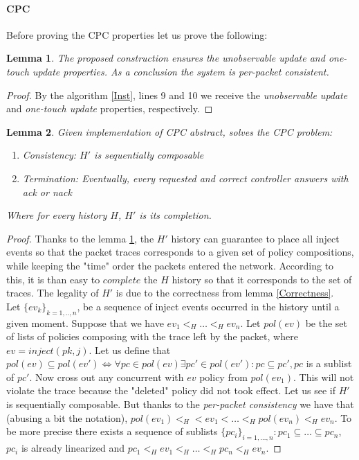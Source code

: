 \documentclass{article}
\newtheorem{lemma}{Lemma}
\theoremstyle{remark}
\begin{document}
\paragraph{CPC} \label{consistencyPC}
Before proving the CPC properties let us prove the following:
\begin{lemma}\label{per-packet consistency} The proposed construction ensures the \emph{unobservable update} and \emph{one-touch update} properties. As a conclusion the system is \emph{per-packet consistent}.
\end{lemma}
\begin{proof}
By the algorithm \ref{Inst}, lines 9 and 10 we receive the \emph{unobservable update} and \emph{one-touch update} properties, respectively.
\end{proof}
\begin{lemma}
Given implementation of CPC abstract, solves the CPC problem:
\begin{enumerate}
\item Consistency: \emph{$H'$ is sequentially composable}
\item Termination: \emph{Eventually, every requested and correct controller answers with} ack or nack
\end{enumerate}
Where for every history $H$, $H'$ is its completion.
\end{lemma}
\begin{proof}
Thanks to the lemma \ref{per-packet consistency}, the $H'$ history can guarantee to place all inject events so that the packet traces corresponds to a given set of policy compositions, while keeping the "time" order the packets entered the network. According to this, it is than easy to $complete$ the $H$ history so that it corresponds to the set of traces.
The legality of $H'$ is due to the correctness from lemma \ref{Correctness}. \\
Let $\lbrace ev_k\rbrace_{k=1,..,n}$, be a sequence of 
inject events occurred in the history until a given moment. Suppose 
that we have $ev_1<_H\ldots <_Hev_n$.
Let $pol(ev)$ be the set of lists of policies composing with the trace left by the packet, where $ev=inject(pk,j)$. Let us define that $pol(ev)\subseteq pol(ev')\Leftrightarrow \forall pc\in pol(ev) \exists pc'\in pol(ev'): pc\subseteq pc',pc$ is a sublist of $pc'$. Now cross out any concurrent with $ev$ policy from $pol(ev_1)$. This will not violate the trace because the "deleted" policy did not took effect. 
Let us see if $H'$ is sequentially composable. But thanks to the \emph{per-packet consistency} we have that (abusing a bit the notation), $pol(ev_1)<_H<ev_1<\ldots <_H pol(ev_n)<_Hev_n$. To be more precise there exists a sequence of sublists $\lbrace pc_i\rbrace_{i=1,\ldots, n}: pc_1\subseteq\ldots\subseteq pc_n$,  $pc_i$ is already linearized and $pc_1<_H ev_1<_H\ldots <_H pc_n<_H ev_n$. 
\end{proof}
\end{document}
